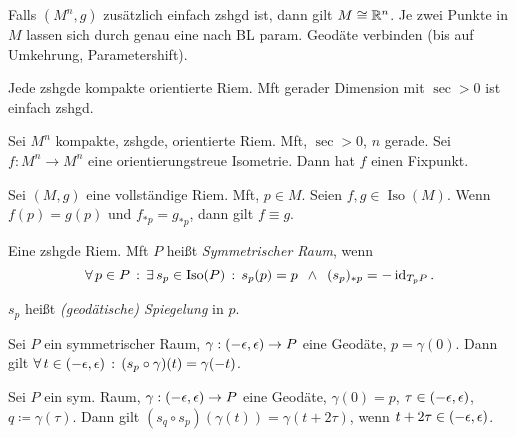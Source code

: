 \documentclass{cheat-sheet}
\newcommand{\vinterval}{\ointerval{-\epsilon}{\epsilon}} %
\DeclareMathOperator{\Iso}{Iso} %
\begin{document}

\begin{kor}
  Falls $(M^n, g)$ zusätzlich einfach zshgd ist, dann gilt $M \cong \mathbb{R}^n$.
  Je zwei Punkte in $M$ lassen sich durch genau eine nach BL param. Geodäte verbinden (bis auf Umkehrung, Parametershift).
\end{kor}


\begin{satz}
  Jede zshgde kompakte orientierte Riem. Mft gerader Dimension mit $\sec > 0$ ist einfach zshgd.
\end{satz}

\begin{satz}
  Sei $M^n$ kompakte, zshgde, orientierte Riem. Mft, $\sec > 0$, $n$ gerade. Sei $f : M^n \to M^n$ eine orientierungstreue Isometrie. Dann hat $f$ einen Fixpunkt.
\end{satz}



\begin{prop}
  Sei $(M, g)$ eine vollständige Riem. Mft, $p \in M$. Seien $f, g \in \Iso(M)$. Wenn $f(p) = g(p)$ und $f_{*p} = g_{*p}$, dann gilt $f \equiv g$.
\end{prop}

\begin{defn}
  Eine zshgde Riem. Mft $P$ heißt \emph{Symmetrischer Raum}, wenn
  \[
    \fa{p \in P} \ex{s_p \in \Iso(P)}
    s_p(p) = p \enspace \wedge \enspace (s_p)_{*p} = - \id_{T_p P}.
  \]
\end{defn}

\begin{sprech}
  $s_p$ heißt \emph{(geodätische) Spiegelung} in $p$.
\end{sprech}

\begin{lem}
  Sei $P$ ein symmetrischer Raum, $\gamma : \vinterval \to P$ eine Geodäte, $p = \gamma(0)$. Dann gilt
  $\fa{t \in \vinterval} (s_p \circ \gamma)(t) = \gamma(-t)$.
\end{lem}

\begin{lem}
  Sei $P$ ein sym. Raum, $\gamma : \vinterval \to P$ eine Geodäte, $\gamma(0) = p$, $\tau \in \vinterval$, $q \coloneqq \gamma(\tau)$. Dann gilt $(s_q \circ s_p)(\gamma(t)) = \gamma(t + 2 \tau)$, wenn $t + 2 \tau \in \vinterval$.
\end{lem}
\end{document}
